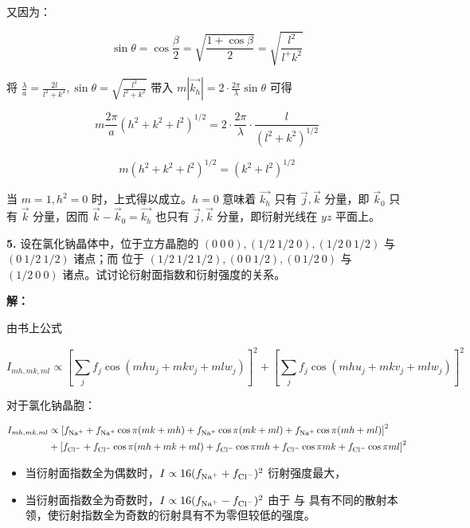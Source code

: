 又因为：

\begin{equation*}
    \sin\theta = \cos \frac{\beta}{2} = \sqrt{\frac{1+\cos\beta}{2}} = \sqrt{\frac{l^2}{l^+k^2}}
\end{equation*}

将 $\frac{\lambda}{a}=\frac{2l}{l^2+k^2}, \sin\theta=\sqrt{\frac{l^2}{l^2+k^2}}$ 带入 $m|\vec{k_h}|=2 \cdot \frac{2\pi}{\lambda} \sin\theta$ 可得

\begin{equation*}
    m \frac{2\pi}{a} \left(h^2+k^2+l^2\right)^{1/2} = 2 \cdot \frac{2\pi}{\lambda} \cdot \frac{l}{\left(l^2+k^2\right)^{1/2}}
\end{equation*}

\begin{equation*}
    m \left(h^2+k^2+l^2\right)^{1/2} = \left(k^2+l^2\right)^{1/2}
\end{equation*}

当 $m=1, h^2=0$ 时，上式得以成立。$h=0$ 意味着 $\vec{k_h}$ 只有 $\vec{j}, \vec{k}$ 分量，即 $\vec{k}_0$ 只有 $\vec{k}$ 分量，因而 $\vec{k}-\vec{k}_0=\vec{k_h}$ 也只有 $\vec{j}, \vec{k}$ 分量，即衍射光线在 $yz$ 平面上。

\noindent \textbf{5.\quad} 设在氯化钠晶体中，位于立方晶胞的 $(0\ 0\ 0), (1/2\ 1/2\ 0), (1/2\ 0\ 1/2)$ 与 $(0\ 1/2\ 1/2)$ 诸点；而  位于 $(1/2\ 1/2\ 1/2), (0\ 0\ 1/2), (0\ 1/2\ 0)$ 与 $(1/2\ 0\ 0)$ 诸点。试讨论衍射面指数和衍射强度的关系。

\noindent \textbf{解：}

由书上公式

\begin{equation*}
    I_{mh, mk, ml} \propto \left[\sum_j f_j \cos(mh u_j + mk v_j + ml w_j)\right]^2 + \left[\sum_j f_j \cos(mh u_j + mk v_j + ml w_j)\right]^2
\end{equation*}

对于氯化钠晶胞：

\begin{align*}
    I_{mh, mk, ml} &\propto \left[f_{\ce{Na^+}} + f_{\ce{Na^+}} \cos\pi(mk+mh) + f_{\ce{Na^+}} \cos\pi(mk+ml) + f_{\ce{Na^+}} \cos\pi(mh+ml)\right]^2 \\
    &+ \left[f_{\ce{Cl^-}} + f_{\ce{Cl^-}}\cos\pi(mh+mk+ml) + f_{\ce{Cl^-}}\cos\pi mh + f_{\ce{Cl^-}}\cos\pi mk + f_{\ce{Cl^-}}\cos\pi ml\right]^2
\end{align*}

\begin{itemize}
    \item 当衍射面指数全为偶数时，$I \propto 16(f_{\ce{Na^+}}+f_{\ce{Cl^-}})^2$ 衍射强度最大，
    \item 当衍射面指数全为奇数时，$I \propto 16(f_{\ce{Na^+}}-f_{\ce{Cl^-}})^2$ 由于  与  具有不同的散射本领，使衍射指数全为奇数的衍射具有不为零但较低的强度。
\end{itemize}

